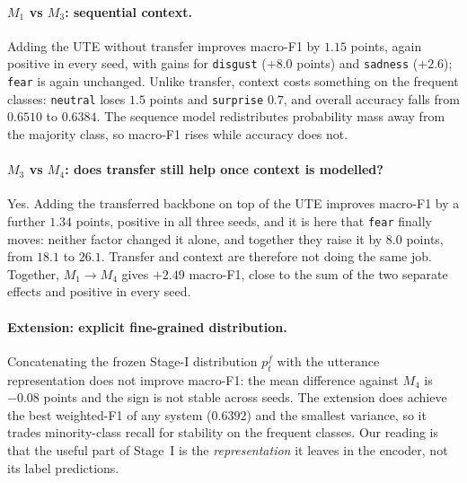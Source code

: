 \documentclass[sigconf,nonacm]{acmart}
\begin{document}
\paragraph{$M_1$ vs $M_3$: sequential context.}
Adding the UTE without transfer improves macro-F1 by $1.15$ points, again positive in every
seed, with gains for \texttt{disgust} ($+8.0$ points) and \texttt{sadness} ($+2.6$);
\texttt{fear} is again unchanged. Unlike transfer, context costs something on the
frequent classes: \texttt{neutral} loses $1.5$ points and \texttt{surprise} $0.7$, and
overall accuracy falls from $0.6510$ to $0.6384$. The sequence model redistributes
probability mass away from the majority class, so macro-F1 rises while accuracy does not.

\paragraph{$M_3$ vs $M_4$: does transfer still help once context is modelled?}
Yes. Adding the transferred backbone on top of the UTE improves macro-F1 by a further
$1.34$ points, positive in all three seeds, and it is here that \texttt{fear} finally
moves: neither factor changed it alone, and together they raise it by $8.0$ points, from
$18.1$ to $26.1$. Transfer and context are therefore not doing the same job. Together, $M_1 \rightarrow M_4$ gives $+2.49$ macro-F1,
close to the sum of the two separate effects and positive in every seed.

\paragraph{Extension: explicit fine-grained distribution.}
Concatenating the frozen Stage-I distribution $p^f_t$ with the utterance representation
does not improve macro-F1: the mean difference against $M_4$ is $-0.08$ points and the sign
is not stable across seeds. The extension does achieve the best weighted-F1 of any system
($0.6392$) and the smallest variance, so it trades minority-class recall for stability on
the frequent classes. Our reading is that the useful part of Stage~I is the
\emph{representation} it leaves in the encoder, not its label predictions.
\end{document}
